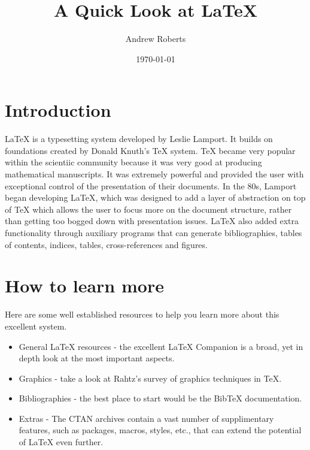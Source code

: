 \documentclass{article}
\newcommand{\BibTeX}{{\sc Bib}\TeX}
\begin{document}
\author{Andrew Roberts}
\title{A Quick Look at \LaTeX}
\date{\today}
\maketitle

\section{Introduction}

\LaTeX{} is a typesetting system developed by Leslie
Lamport\cite{lamport94}.  It builds on foundations created by Donald
Knuth's \TeX{} system\cite{knuth79}.  \TeX{} became very popular within
the scientiic community because it was very good at producing
mathematical manuscripts.  It was extremely powerful and provided the
user with exceptional control of the presentation of their documents.
In the 80s, Lamport began developing \LaTeX, which was designed to add a
layer of abstraction on top of \TeX{} which allows the user to focus
more on the document structure, rather than getting too bogged down with
presentation issues.  \LaTeX{} also added extra functionality through
auxiliary programs that can generate bibliographies, tables of contents,
indices, tables, cross-references and figures.

\section{How to learn more}
Here are some well established resources to help you learn more about
this excellent system.

\begin{itemize}
	
	\item General \LaTeX{} resources - the excellent \LaTeX{}
Companion\cite{goossens93} is a broad, yet in depth look at the most
important aspects.

	\item Graphics - take a look at Rahtz's\cite{rahtz89} survey of graphics
techniques in \TeX. 

	\item Bibliographies - the best place to start would be the
\BibTeX{} documentation\cite{patashnik88}.

	\item Extras - The CTAN archives\cite{greenwade93} contain a vast
number of supplimentary features, such as packages, macros, styles,
etc., that can extend the potential of \LaTeX{} even further.

\end{itemize}



\end{document}
